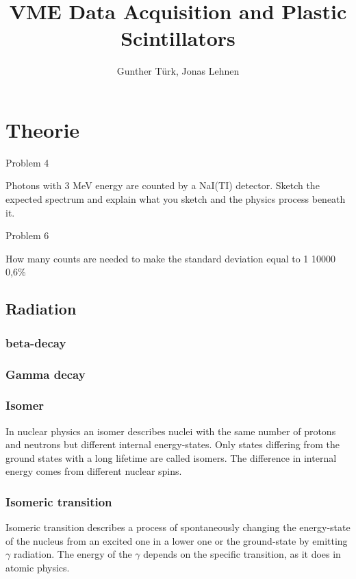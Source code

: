 \documentclass[]{article}
\title{VME Data Acquisition and Plastic Scintillators}
\author{Gunther T\"urk, Jonas Lehnen}
\begin{document}
\maketitle
\begin{abstract}


\end{abstract}

\tableofcontents

\newpage
\section{Theorie}








Problem 4 

Photons with 3 MeV energy are counted by a NaI(TI) detector. Sketch the expected spectrum and explain what you sketch and the physics process beneath it. 


Problem 6 

How many counts are needed to make the standard deviation equal to 1%
10000
0,6\%

\subsection{Radiation}\label{radiation}
\subsubsection{beta-decay}

\subsubsection{Gamma decay}

\subsubsection{Isomer}
In nuclear physics an isomer describes nuclei with the same number of protons and neutrons but different internal energy-states. Only states differing from the ground states with a long lifetime are called isomers. The difference in internal energy comes from different nuclear spins.
\subsubsection{Isomeric transition}
Isomeric transition describes a process of spontaneously changing the energy-state of the nucleus from an excited one in a lower one or the ground-state by emitting $\gamma$ radiation. The energy of the $\gamma$ depends on the specific transition, as it does in atomic physics.
\end{document}
